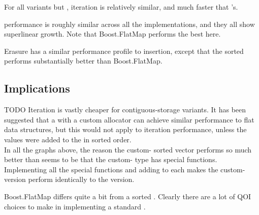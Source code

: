 
For all variants but , iteration is relatively similar, and much
faster that 's.


 performance is roughly similar across all the
implementations, and they all show superlinear growth.  Note that
Boost.FlatMap performs the best here.


Erasure has a similar performance profile to insertion, except that the sorted
 performs substantially better than
Boost.FlatMap.\\


\subsection{Implications}

TODO Iteration is vastly cheaper for contiguous-storage variants.  It has been
suggested that a  with a custom allocator can achieve similar
performance to flat data structures, but this would not apply to iteration
performance, unless the values were added to the  in sorted order.\\

In all the graphs above, the reason the custom- sorted vector
performs so much better than  seems to be that
the custom- type has  special functions.
Implementing all the special functions and adding  to
each makes the custom- version perform identically to the
 version.

Boost.FlatMap differs quite a bit from a sorted .  Clearly there
are a lot of QOI choices to make in implementing a standard .
